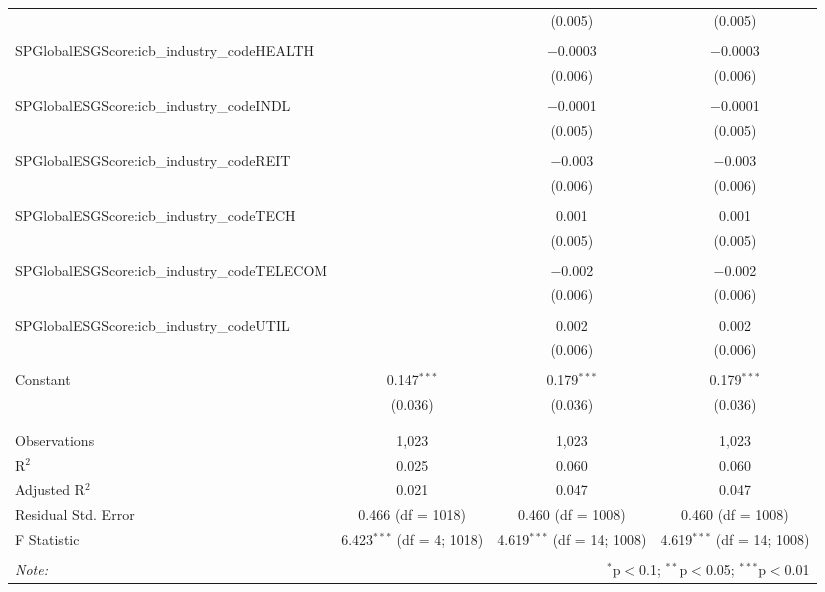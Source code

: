 \begin{table}[!htbp]
{\begin{tabular}{@{\extracolsep{5pt}}lccc}
  &  & (0.005) & (0.005) \\ 
  & & & \\ 
 SPGlobalESGScore:icb\_industry\_codeHEALTH &  & $-$0.0003 & $-$0.0003 \\ 
  &  & (0.006) & (0.006) \\ 
  & & & \\ 
 SPGlobalESGScore:icb\_industry\_codeINDL &  & $-$0.0001 & $-$0.0001 \\ 
  &  & (0.005) & (0.005) \\ 
  & & & \\ 
 SPGlobalESGScore:icb\_industry\_codeREIT &  & $-$0.003 & $-$0.003 \\ 
  &  & (0.006) & (0.006) \\ 
  & & & \\ 
 SPGlobalESGScore:icb\_industry\_codeTECH &  & 0.001 & 0.001 \\ 
  &  & (0.005) & (0.005) \\ 
  & & & \\ 
 SPGlobalESGScore:icb\_industry\_codeTELECOM &  & $-$0.002 & $-$0.002 \\ 
  &  & (0.006) & (0.006) \\ 
  & & & \\ 
 SPGlobalESGScore:icb\_industry\_codeUTIL &  & 0.002 & 0.002 \\ 
  &  & (0.006) & (0.006) \\ 
  & & & \\ 
 Constant & 0.147$^{***}$ & 0.179$^{***}$ & 0.179$^{***}$ \\ 
  & (0.036) & (0.036) & (0.036) \\ 
  & & & \\ 
\hline \\[-1.8ex] 
Observations & 1,023 & 1,023 & 1,023 \\ 
R$^{2}$ & 0.025 & 0.060 & 0.060 \\ 
Adjusted R$^{2}$ & 0.021 & 0.047 & 0.047 \\ 
Residual Std. Error & 0.466 (df = 1018) & 0.460 (df = 1008) & 0.460 (df = 1008) \\ 
F Statistic & 6.423$^{***}$ (df = 4; 1018) & 4.619$^{***}$ (df = 14; 1008) & 4.619$^{***}$ (df = 14; 1008) \\ 
\hline 
\hline \\[-1.8ex] 
\textit{Note:}  & \multicolumn{3}{r}{$^{*}$p$<$0.1; $^{**}$p$<$0.05; $^{***}$p$<$0.01} \\ 
\end{tabular} 
    }
\end{table} 